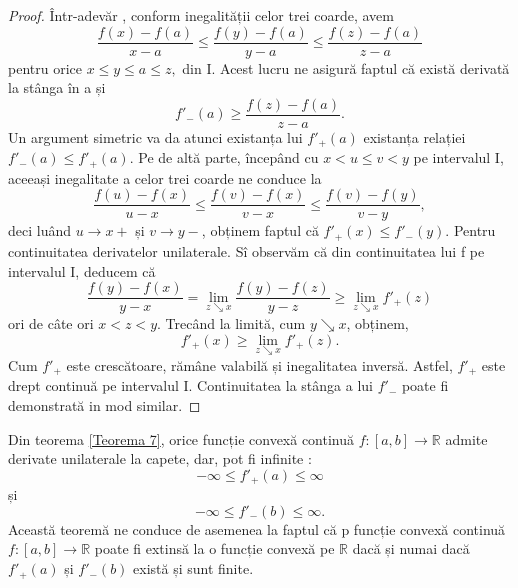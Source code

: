 \documentclass[a4paper,12pt,oneside]{report}
\begin{document}
\begin{proof}
Într-adevăr , conform inegalității celor trei coarde, avem
\begin{displaymath}
   \frac{f\left ( x \right ) - f\left ( a \right )}{x-a} \leq \frac{f\left ( y \right ) - f\left ( a \right )}{y-a}\leq \frac{f\left ( z \right ) - f\left ( a \right )}{z -a }
\end{displaymath}
pentru orice \(x\leq y\leq a\leq z,\) din I. Acest lucru ne asigură faptul că există derivată la stânga în a și 
\begin{displaymath}
   {f}'_{-}\left ( a \right )\geq \frac{f\left ( z \right ) - f\left ( a \right )}{z-a}.
\end{displaymath}
Un argument simetric va da atunci existanța lui \({f}'_{+}\left ( a \right )\) existanța relației \({f}'_{-}\left ( a \right ) \leq  {f}'_{+}\left ( a \right )\). Pe de altă parte, începând cu \(x < u\leq v < y\) pe intervalul I, aceeași inegalitate a celor trei coarde ne conduce la
\begin{displaymath}
   \frac{f\left ( u \right ) - f\left ( x \right )}{u-x}\leq \frac{f\left ( v \right ) - f\left ( x \right )}{v - x}\leq \frac{f\left ( v \right ) - f\left ( y  \right )}{v - y},
\end{displaymath}
deci luând \(u\rightarrow x+\) și \(v\rightarrow y- \), obținem faptul că \({f}'_{+}\left ( x \right )\leq {f}'_{-}\left ( y \right ).\) 
Pentru continuitatea derivatelor unilaterale. Sî observăm că din continuitatea lui f pe intervalul I, deducem că 
\begin{displaymath}
   \frac{f\left ( y \right ) - f\left ( x \right )}{y-x} = \lim_{z \searrow x}\frac{f\left ( y \right ) - f\left ( z \right )}{y-z} \geq \lim_{z\searrow x}{f}'_{+}\left ( z \right )
\end{displaymath}
ori de câte ori \(x < z < y\). Trecând la limită, cum  \(y\searrow x \), obținem, 
\begin{displaymath}
 {f}'_{+}\left ( x \right ) \geq  \lim_{z \searrow x } {f}'_{+}\left ( z \right ). 
\end{displaymath}
Cum \({f}'_{+}\) este crescătoare, rămâne valabilă și inegalitatea inversă. Astfel, \({f}'_{+}\)  este drept continuă pe intervalul I. Continuitatea la stânga a lui \({f}'_{-}\)  poate fi demonstrată in mod similar. 
\end{proof}
Din teorema \ref{Teorema 7}, orice funcție convexă continuă \(f:\left [ a,b \right ]\rightarrow \mathbb{R}\) admite derivate unilaterale la capete, dar, pot fi infinite :
\begin{displaymath}
   - \infty  \leq  {f}'_{+}\left ( a \right ) \leq \infty
\end{displaymath}
și 
\begin{displaymath}
- \infty  \leq  {f}'_{-}\left ( b \right ) \leq \infty. 
\end{displaymath}
Această teoremă ne conduce de asemenea la faptul că p funcție convexă continuă \(f:\left [ a,b \right ]\rightarrow \mathbb{R}\) poate fi extinsă la o funcție convexă pe \(\mathbb{R}\) dacă și numai dacă   \({f}'_{+}\left ( a \right )\) și  \( {f}'_{-}\left ( b \right )\)  există și sunt finite. 
\end{document}
